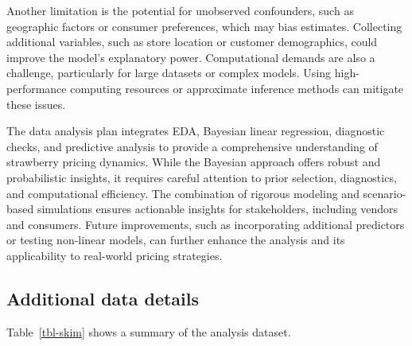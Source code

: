 \documentclass[
  letterpaper,
  DIV=11,
  numbers=noendperiod]{scrartcl}
\begin{document}
Another limitation is the potential for unobserved confounders, such as
geographic factors or consumer preferences, which may bias estimates.
Collecting additional variables, such as store location or customer
demographics, could improve the model's explanatory power. Computational
demands are also a challenge, particularly for large datasets or complex
models. Using high-performance computing resources or approximate
inference methods can mitigate these issues.

The data analysis plan integrates EDA, Bayesian linear regression,
diagnostic checks, and predictive analysis to provide a comprehensive
understanding of strawberry pricing dynamics. While the Bayesian
approach offers robust and probabilistic insights, it requires careful
attention to prior selection, diagnostics, and computational efficiency.
The combination of rigorous modeling and scenario-based simulations
ensures actionable insights for stakeholders, including vendors and
consumers. Future improvements, such as incorporating additional
predictors or testing non-linear models, can further enhance the
analysis and its applicability to real-world pricing strategies.

\subsection{Additional data details}\label{additional-data-details}

Table~\ref{tbl-skim} shows a summary of the analysis dataset.
\end{document}
